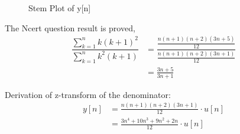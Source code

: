 \documentclass[journal,12pt,twocolumn]{IEEEtran}
\theoremstyle{remark}
\begin{document}
\begin{enumerate}[label=\alph*)]
\begin{figure}[h]
        \caption{Stem Plot of y[n]}
    \end{figure}
\vspace{1cm}

The Ncert question result is proved,
\begin{align}
     \dfrac{ \sum_{k=1}^n k(k+1)^2 }{\sum_{k=1}^n k^2(k+1)} &= \dfrac{\frac{n(n+1)(n+2)(3n+5)}{12}}{\frac{n(n+1)(n+2)(3n+1)}{12}}\\
                                                            &= \frac{3n+5}{3n+1}
\end{align}

Derivation of z-transform of the denominator:
\begin{align}
    y[n] &= \frac{n(n+1)(n+2)(3n+1)}{12}\cdot u[n]\\
         &= \frac{3n^4 + 10n^3 + 9n^2 + 2n}{12}\cdot u[n]\
\end{align}


\end{enumerate}
\end{document}
